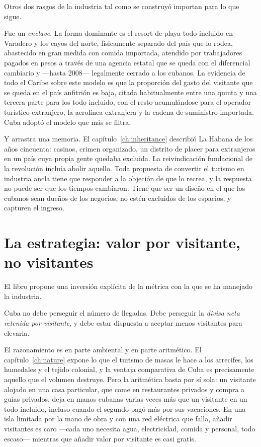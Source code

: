 Otros dos rasgos de la industria tal como se construyó importan para lo que sigue.

Fue un \emph{enclave}. La forma dominante es el resort de playa todo incluido en Varadero
y los cayos del norte, físicamente separado del país que lo rodea, abastecido en gran
medida con comida importada, atendido por trabajadores pagados en pesos a través de una
agencia estatal que se queda con el diferencial cambiario y ---hasta 2008--- legalmente
cerrado a los cubanos. La evidencia de todo el Caribe sobre este modelo es que la
proporción del gasto del visitante que se queda en el país anfitrión es baja, citada
habitualmente entre una quinta y una tercera parte para los todo incluido, con el resto
acumulándose para el operador turístico extranjero, la aerolínea extranjera y la cadena de
suministro importada.\unv{} Cuba adoptó el modelo que más se filtra.

Y arrastra una memoria. El capítulo~\ref{ch:inheritance} describió La Habana de los
años cincuenta: casinos, crimen organizado, un distrito de placer para extranjeros en un
país cuya propia gente quedaba excluida. La reivindicación fundacional de la revolución
incluía abolir aquello. Toda propuesta de convertir el turismo en industria ancla tiene
que responder a la objeción de que lo recrea, y la respuesta no puede ser que los tiempos
cambiaron. Tiene que ser un diseño en el que los cubanos sean dueños de los negocios, no
estén excluidos de los espacios, y capturen el ingreso.

\section{La estrategia: valor por visitante, no visitantes}

El libro propone una inversión explícita de la métrica con la que se ha manejado la
industria.

Cuba no debe perseguir el número de llegadas. Debe perseguir la \emph{divisa neta
retenida por visitante}, y debe estar dispuesta a aceptar menos visitantes para elevarla.

El razonamiento es en parte ambiental y en parte aritmético. El capítulo~\ref{ch:nature}
expone lo que el turismo de masas le hace a los arrecifes, los humedales y el tejido
colonial, y la ventaja comparativa de Cuba es precisamente aquello que el volumen destruye.
Pero la aritmética basta por sí sola: un visitante alojado en una casa particular, que come
en restaurantes privados y compra a guías privados, deja en manos cubanas varias veces más
que un visitante en un todo incluido, incluso cuando el segundo pagó más por sus
vacaciones. En una isla limitada por la mano de obra y con una red eléctrica que falla,
añadir visitantes es caro ---cada uno necesita agua, electricidad, comida y personal, todo
escaso--- mientras que añadir valor por visitante es casi gratis.

